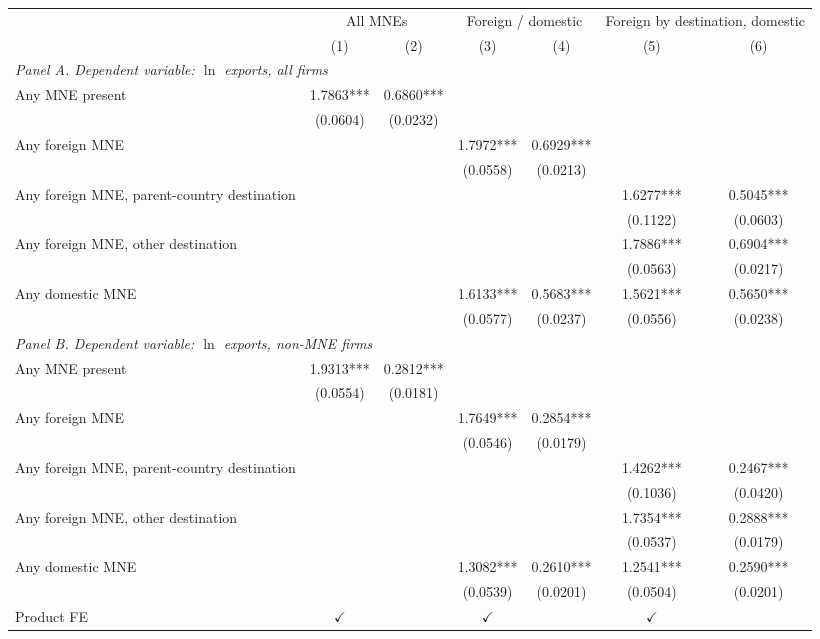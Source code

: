 \begin{tabular}{lcccccc} \hline
 & \multicolumn{2}{c}{All MNEs} & \multicolumn{2}{c}{Foreign / domestic} & \multicolumn{2}{c}{Foreign by destination, domestic} \\
 & (1) & (2) & (3) & (4) & (5) & (6) \\ \hline
\multicolumn{7}{l}{\textit{Panel A. Dependent variable: $\ln$ exports, all firms}} \\
Any MNE present & 1.7863*** & 0.6860*** &  &  &  &  \\
 & (0.0604) & (0.0232) &  &  &  &  \\
Any foreign MNE &  &  & 1.7972*** & 0.6929*** &  &  \\
 &  &  & (0.0558) & (0.0213) &  &  \\
Any foreign MNE, parent-country destination &  &  &  &  & 1.6277*** & 0.5045*** \\
 &  &  &  &  & (0.1122) & (0.0603) \\
Any foreign MNE, other destination &  &  &  &  & 1.7886*** & 0.6904*** \\
 &  &  &  &  & (0.0563) & (0.0217) \\
Any domestic MNE &  &  & 1.6133*** & 0.5683*** & 1.5621*** & 0.5650*** \\
 &  &  & (0.0577) & (0.0237) & (0.0556) & (0.0238) \\
\midrule
\multicolumn{7}{l}{\textit{Panel B. Dependent variable: $\ln$ exports, non-MNE firms}} \\
Any MNE present & 1.9313*** & 0.2812*** &  &  &  &  \\
 & (0.0554) & (0.0181) &  &  &  &  \\
Any foreign MNE &  &  & 1.7649*** & 0.2854*** &  &  \\
 &  &  & (0.0546) & (0.0179) &  &  \\
Any foreign MNE, parent-country destination &  &  &  &  & 1.4262*** & 0.2467*** \\
 &  &  &  &  & (0.1036) & (0.0420) \\
Any foreign MNE, other destination &  &  &  &  & 1.7354*** & 0.2888*** \\
 &  &  &  &  & (0.0537) & (0.0179) \\
Any domestic MNE &  &  & 1.3082*** & 0.2610*** & 1.2541*** & 0.2590*** \\
 &  &  & (0.0539) & (0.0201) & (0.0504) & (0.0201) \\
\hline
Product FE & $\checkmark$ &  & $\checkmark$ &  & $\checkmark$ &  \\

\end{tabular}
